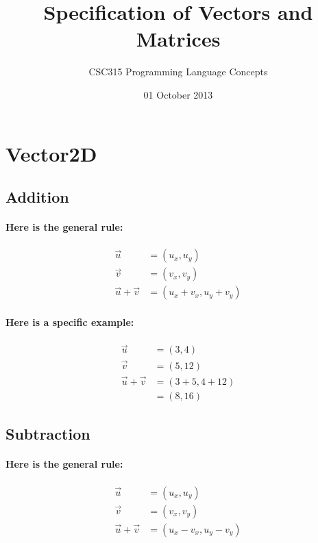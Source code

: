 \documentclass[twoside]{article}
\title{Specification of Vectors and Matrices}
\author{CSC315 Programming Language Concepts}
\date{01 October 2013}
\begin{document}
\maketitle

\section{Vector2D}

\subsection{Addition}

\paragraph{Here is the general rule:}

\begin{align*}
  \vec{u} & = (u_x, u_y) \\
  \vec{v} & = (v_x, v_y) \\
  \vec{u} + \vec{v} & = (u_x + v_x, u_y + v_y) 
  \end{align*}

\paragraph{Here is a specific example:}

\begin{align*}
  \vec{u} & = (3, 4) \\
  \vec{v} & = (5, 12) \\
  \vec{u} + \vec{v} & = (3 + 5, 4 + 12) \\
                          & = (8, 16)
  \end{align*}

\subsection{Subtraction}

\paragraph{Here is the general rule:}

\begin{align*}
  \vec{u} & = (u_x, u_y) \\
  \vec{v} & = (v_x, v_y) \\
  \vec{u} + \vec{v} & = (u_x - v_x, u_y - v_y) 
  \end{align*}
\end{document}
